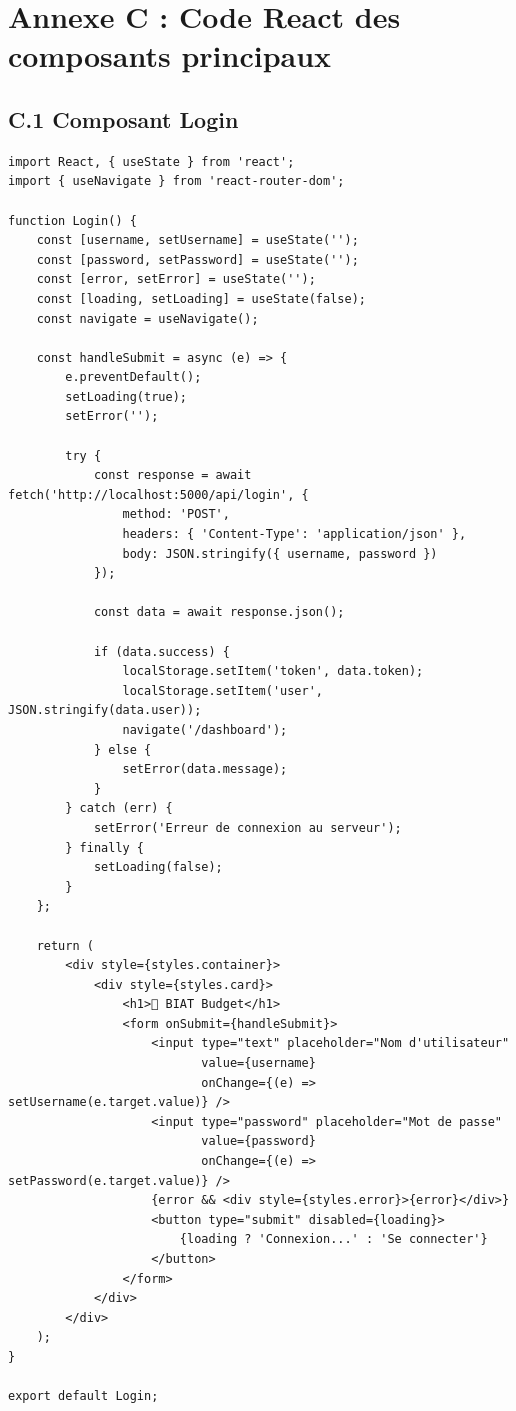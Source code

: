 \newpage

\section*{Annexe C : Code React des composants principaux}

\subsection*{C.1 Composant Login}

\begin{verbatim}
import React, { useState } from 'react';
import { useNavigate } from 'react-router-dom';

function Login() {
    const [username, setUsername] = useState('');
    const [password, setPassword] = useState('');
    const [error, setError] = useState('');
    const [loading, setLoading] = useState(false);
    const navigate = useNavigate();

    const handleSubmit = async (e) => {
        e.preventDefault();
        setLoading(true);
        setError('');

        try {
            const response = await fetch('http://localhost:5000/api/login', {
                method: 'POST',
                headers: { 'Content-Type': 'application/json' },
                body: JSON.stringify({ username, password })
            });

            const data = await response.json();

            if (data.success) {
                localStorage.setItem('token', data.token);
                localStorage.setItem('user', JSON.stringify(data.user));
                navigate('/dashboard');
            } else {
                setError(data.message);
            }
        } catch (err) {
            setError('Erreur de connexion au serveur');
        } finally {
            setLoading(false);
        }
    };

    return (
        <div style={styles.container}>
            <div style={styles.card}>
                <h1>🏦 BIAT Budget</h1>
                <form onSubmit={handleSubmit}>
                    <input type="text" placeholder="Nom d'utilisateur" 
                           value={username} 
                           onChange={(e) => setUsername(e.target.value)} />
                    <input type="password" placeholder="Mot de passe" 
                           value={password} 
                           onChange={(e) => setPassword(e.target.value)} />
                    {error && <div style={styles.error}>{error}</div>}
                    <button type="submit" disabled={loading}>
                        {loading ? 'Connexion...' : 'Se connecter'}
                    </button>
                </form>
            </div>
        </div>
    );
}

export default Login;
\end{verbatim}

